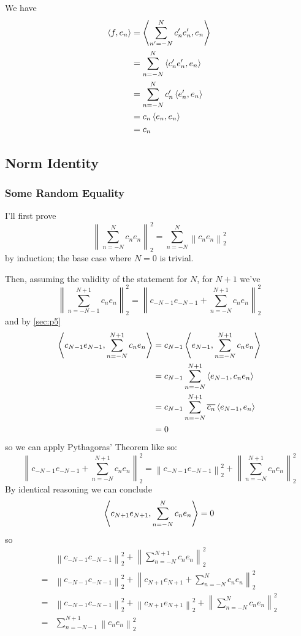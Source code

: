 \documentclass[12pt]{article}
\newcommand{\norm}[1]{\left\lVert#1\right\rVert}
\begin{document}
We have
\begin{align*}
  \Braket{f, e_n}
   & = \Braket{\sum_{n'=-N}^{N} c_n'e_n', e_n} \\
   & = \sum_{n=-N}^{N} \Braket{c_n'e_n', e_n}  \\
   & = \sum_{n=-N}^{N} c_n'\Braket{e_n', e_n}  \\
   & = c_n\Braket{e_n, e_n}                    \\
   & = c_n
\end{align*}

\subsection{Norm Identity}

\subsubsection{Some Random Equality}

I'll first prove
\[\norm{\sum_{n=-N}^{N} c_ne_n}_2^2 = \sum_{n=-N}^{N} \norm{c_ne_n}_2^2\]
by induction; the base case where $N=0$ is trivial.

Then, assuming the validity of the statement for $N$, for $N+1$ we've
\[\norm{\sum_{n=-N-1}^{N+1} c_ne_n}_2^2
  = \norm{c_{-N-1}e_{-N-1}+\sum_{n=-N}^{N+1} c_ne_n}_2^2\]
and by \ref{sec:p5}
\begin{align*}
  \Braket{c_{N-1}e_{N-1}, \sum_{n=-N}^{N+1} c_ne_n}
   & = c_{N-1}\Braket{e_{N-1}, \sum_{n=-N}^{N+1} c_ne_n}            \\
   & = c_{N-1}\sum_{n=-N}^{N+1} \Braket{e_{N-1}, c_ne_n}            \\
   & = c_{N-1}\sum_{n=-N}^{N+1} \overline{c_n}\Braket{e_{N-1}, e_n} \\
   & = 0
\end{align*}
so we can apply Pythagoras' Theorem like so:
\[\norm{c_{-N-1}e_{-N-1}+\sum_{n=-N}^{N+1} c_ne_n}_2^2
  =\norm{c_{-N-1}e_{-N-1}}_2^2+\norm{\sum_{n=-N}^{N+1} c_ne_n}_2^2\]
By identical reasoning we can conclude
\[\Braket{c_{N+1}e_{N+1}, \sum_{n=-N}^{N} c_ne_n}=0\]
so
\begin{align*}
      & \norm{c_{-N-1}c_{-N-1}}_2^2+\norm{\sum_{n=-N}^{N+1} c_ne_n}_2^2                         \\
  ={} & \norm{c_{-N-1}c_{-N-1}}_2^2+\norm{c_{N+1}e_{N+1} + \sum_{n=-N}^{N} c_ne_n}_2^2          \\
  ={} & \norm{c_{-N-1}c_{-N-1}}_2^2+\norm{c_{N+1}e_{N+1}}_2^2+\norm{\sum_{n=-N}^{N} c_ne_n}_2^2 \\
  ={} & \sum_{n=-N-1}^{N+1} \norm{c_ne_n}_2^2
\end{align*}
\end{document}
